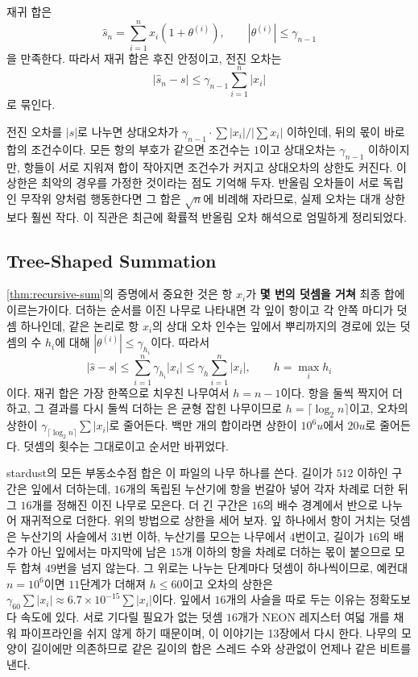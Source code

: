 \begin{theorem}
\label{thm:recursive-sum}
재귀 합은
\[
\hat s_n=\sum_{i=1}^nx_i(1+\theta^{(i)}),\qquad|\theta^{(i)}|\le\gamma_{n-1}
\]
을 만족한다. 따라서 재귀 합은 후진 안정이고, 전진 오차는
\[
|\hat s_n-s|\le\gamma_{n-1}\sum_{i=1}^n|x_i|
\]
로 묶인다.
\end{theorem}

전진 오차를 $|s|$로 나누면 상대오차가 $\gamma_{n-1}\cdot\sum|x_i|/|\sum x_i|$ 이하인데, 뒤의 몫이 바로 합의 조건수이다. 모든 항의 부호가 같으면 조건수는 $1$이고 상대오차는 $\gamma_{n-1}$ 이하이지만, 항들이 서로 지워져 합이 작아지면 조건수가 커지고 상대오차의 상한도 커진다. 이 상한은 최악의 경우를 가정한 것이라는 점도 기억해 두자. 반올림 오차들이 서로 독립인 무작위 양처럼 행동한다면 그 합은 $\sqrt n$에 비례해 자라므로, 실제 오차는 대개 상한보다 훨씬 작다. 이 직관은 최근에 확률적 반올림 오차 해석으로 엄밀하게 정리되었다\cite{higham2019probabilistic}.

\subsection{Tree-Shaped Summation}

\cref{thm:recursive-sum}의 증명에서 중요한 것은 항 $x_i$가 \textbf{몇 번의 덧셈을 거쳐} 최종 합에 이르는가이다. 더하는 순서를 이진 나무로 나타내면 각 잎이 항이고 각 안쪽 마디가 덧셈 하나인데, 같은 논리로 항 $x_i$의 상대 오차 인수는 잎에서 뿌리까지의 경로에 있는 덧셈의 수 $h_i$에 대해 $|\theta^{(i)}|\le\gamma_{h_i}$이다. 따라서
\[
|\hat s-s|\le\sum_{i=1}^n\gamma_{h_i}|x_i|\le\gamma_h\sum_{i=1}^n|x_i|,\qquad h=\max_ih_i
\]
이다. 재귀 합은 가장 한쪽으로 치우친 나무여서 $h=n-1$이다. 항을 둘씩 짝지어 더하고, 그 결과를 다시 둘씩 더하는 은 균형 잡힌 나무이므로 $h=\lceil\log_2n\rceil$이고, 오차의 상한이 $\gamma_{\lceil\log_2n\rceil}\sum|x_i|$로 줄어든다\cite{higham1993summation}. 백만 개의 합이라면 상한이 $10^6u$에서 $20u$로 줄어든다. 덧셈의 횟수는 그대로이고 순서만 바뀌었다.

\begin{instardust}
stardust의 모든 부동소수점 합은 이 파일의 나무 하나를 쓴다. 길이가 $512$ 이하인 구간은 잎에서 더하는데, $16$개의 독립된 누산기에 항을 번갈아 넣어 각자 차례로 더한 뒤 그 $16$개를 정해진 이진 나무로 모은다. 더 긴 구간은 $16$의 배수 경계에서 반으로 나누어 재귀적으로 더한다. 위의 방법으로 상한을 세어 보자. 잎 하나에서 항이 거치는 덧셈은 누산기의 사슬에서 $31$번 이하, 누산기를 모으는 나무에서 $4$번이고, 길이가 $16$의 배수가 아닌 잎에서는 마지막에 남은 $15$개 이하의 항을 차례로 더하는 몫이 붙으므로 모두 합쳐 $49$번을 넘지 않는다. 그 위로는 나누는 단계마다 덧셈이 하나씩이므로, 예컨대 $n=10^6$이면 $11$단계가 더해져 $h\le60$이고 오차의 상한은 $\gamma_{60}\sum|x_i|\approx6.7\times10^{-15}\sum|x_i|$이다. 잎에서 $16$개의 사슬을 따로 두는 이유는 정확도보다 속도에 있다. 서로 기다릴 필요가 없는 덧셈 $16$개가 NEON 레지스터 여덟 개를 채워 파이프라인을 쉬지 않게 하기 때문이며, 이 이야기는 13장에서 다시 한다. 나무의 모양이 길이에만 의존하므로 같은 길이의 합은 스레드 수와 상관없이 언제나 같은 비트를 낸다.
\end{instardust}

